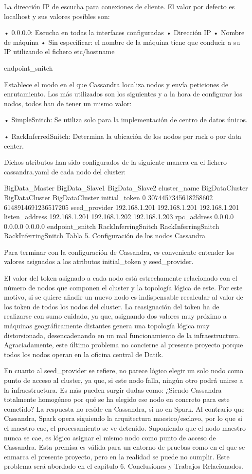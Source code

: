 La dirección IP de escucha para conexiones de cliente. El valor por defecto es localhost y sus valores posibles son:

•	0.0.0.0: Escucha en todas la interfaces configuradas
•	Dirección IP
•	Nombre de máquina
•	Sin especificar: el nombre de la máquina tiene que conducir a su IP utilizando el fichero etc/hostname

endpoint_snitch

Establece el modo en el que Cassandra localiza nodos y envía peticiones de enrutamiento. Los más utilizados son los siguientes y a la hora de configurar los nodos, todos han de tener un mismo valor:

•	SimpleSnitch: Se utiliza solo para la implementación de centro de datos únicos.

•	RackInferredSnitch: Determina la ubicación de los nodos por rack o por data center. 

Dichos atributos han sido configurados de la siguiente manera en el fichero cassandra.yaml de cada nodo del cluster: 

BigData_Master	BigData_Slave1	BigData_Slave2
cluster_name	BigDataCluster	BigDataCluster	BigDataCluster
initial_token	0	3074457345618258602	6148914691236517205
seed_provider	192.168.1.201	192.168.1.201	192.168.1.201
listen_address	192.168.1.201	192.168.1.202	192.168.1.203
rpc_address	0.0.0.0	0.0.0.0	0.0.0.0
endpoint_snitch	RackInferringSnitch	RackInferringSnitch	RackInferringSnitch
Tabla 5. Configuración de los nodos Cassandra

Para terminar con la configuración de Cassandra, es conveniente entender los valores asignados a los atributos initial_token y seed_provider. 

El valor del token asignado a cada nodo está estrechamente relacionado con el número de nodos que componen el cluster y la topología lógica de este. Por este motivo, si se quiere añadir un nuevo nodo es indispensable recalcular al valor de los token de todos los nodos del cluster. La reasignación del token ha de realizarse con sumo cuidado,  ya que, asignando dos valores muy próximo a máquinas geográficamente distantes genera una topología lógica muy distorsionada, desencadenando en un mal funcionamiento de la infraestructura. Agraciadamente, este último problema no concierne al presente proyecto porque todos los nodos operan en la oficina central de Datik. 

En cuanto al seed_provider se refiere, no parece lógico elegir un solo nodo como punto de acceso al cluster, ya que, si este nodo falla, ningún otro podrá unirse a la infraestructura. Es más pueden surgir dudas como: ¿Siendo Cassandra totalmente homogéneo por qué se ha elegido ese nodo en concreto para este cometido? La respuesta no reside en Cassandra, si no en Spark. Al contrario que Cassandra, Spark opera siguiendo la arquitectura maestro/esclavo, por lo que si el maestro cae, el procesamiento se ve detenido. Suponiendo que el nodo maestro nunca se cae,  es lógico asignar el mismo nodo como punto de acceso de Cassandra. Esta premisa es válida para un entorno de pruebas como en el que se enmarca el presente proyecto, pero en la realidad se puede no cumplir. Este problema será abordado en el capítulo 6. Conclusiones y Trabajos Relacionados.

